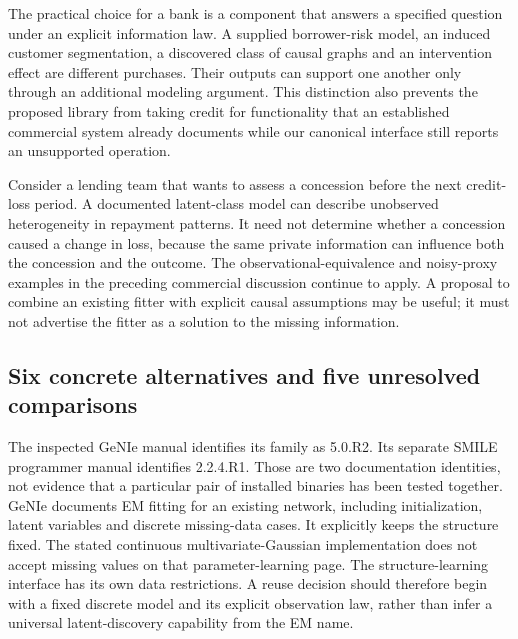 \label{exec14:commercial-latent-choice}

The practical choice for a bank is a component that answers a specified
question under an explicit information law. A supplied borrower-risk
model, an induced customer segmentation, a discovered class of causal
graphs and an intervention effect are different purchases. Their outputs
can support one another only through an additional modeling argument.
This distinction also prevents the proposed library from taking credit
for functionality that an established commercial system already
documents while our canonical interface still reports an unsupported
operation.

Consider a lending team that wants to assess a concession before the
next credit-loss period. A documented latent-class model can describe
unobserved heterogeneity in repayment patterns. It need not determine
whether a concession caused a change in loss, because the same private
information can influence both the concession and the outcome. The
observational-equivalence and noisy-proxy examples in the preceding
commercial discussion continue to apply. A proposal to combine an
existing fitter with explicit causal assumptions may be useful; it must
not advertise the fitter as a solution to the missing information.

\hypertarget{six-concrete-alternatives-and-five-unresolved-comparisons}{%
\subsection{Six concrete alternatives and five unresolved
comparisons}\label{six-concrete-alternatives-and-five-unresolved-comparisons}}

The inspected GeNIe manual identifies its family as 5.0.R2. Its separate
SMILE programmer manual identifies 2.2.4.R1. Those are two documentation
identities, not evidence that a particular pair of installed binaries
has been tested together. GeNIe documents EM fitting for an existing
network, including initialization, latent variables and discrete
missing-data cases. It explicitly keeps the structure fixed. The stated
continuous multivariate-Gaussian implementation does not accept missing
values on that parameter-learning page. The structure-learning interface
has its own data restrictions. A reuse decision should therefore begin
with a fixed discrete model and its explicit observation law, rather
than infer a universal latent-discovery capability from the EM name.
\citep{exec13_genie_readme,exec13_smile_intro,exec13_latent_genie_structure,exec13_latent_genie_parameters}


